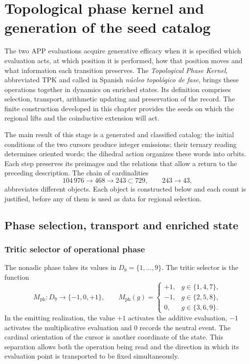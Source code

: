 \section{Topological phase kernel and generation of the seed catalog}
\label{tpk:capitulo}

The two APP evaluations acquire generative efficacy when it is specified
which evaluation acts, at which position it is performed, how that position moves
and what information each transition preserves. The \emph{Topological Phase Kernel},
abbreviated TPK and called in Spanish \emph{núcleo topológico de fase}, brings
these operations together in dynamics on enriched states. Its definition
comprises selection, transport, arithmetic updating and preservation of the
record. The finite construction developed in this chapter provides
the seeds on which the regional lifts and the coinductive
extension will act.

The main result of this stage is a generated and classified catalog:
the initial conditions of the two cursors produce integer emissions;
their ternary reading determines oriented words; the dihedral action organizes
these words into orbits. Each step preserves its preimages and the relations
that allow a return to the preceding description. The chain of cardinalities
\[
 104\,976\longrightarrow468\longrightarrow243\subset729,
 \qquad 243\longrightarrow43,
\]
abbreviates different objects. Each object is constructed below and each
count is justified, before any of them is used as data for
regional selection.

\subsection{Phase selection, transport and enriched state}
\label{tpk:operaciones}

\subsubsection{Tritic selector of operational phase}

The nonadic phase takes its values in \(D_9=\{1,\ldots,9\}\). The tritic
selector is the function
\begin{equation}
 M_{\mathrm{ph}}:D_9\longrightarrow\{-1,0,+1\},\qquad
 M_{\mathrm{ph}}(g)=
 \begin{cases}
 +1,&g\in\{1,4,7\},\\
 -1,&g\in\{2,5,8\},\\
 0,&g\in\{3,6,9\}.
 \end{cases}
 \label{tpk:selector}
\end{equation}
In the emitting realization, the value \(+1\) activates the additive evaluation,
\(-1\) activates the multiplicative evaluation and \(0\) records the neutral
event. The cardinal orientation of the cursor is another coordinate of the state.
This separation allows both the operation being read and the
direction in which its evaluation point is transported to be fixed simultaneously.

